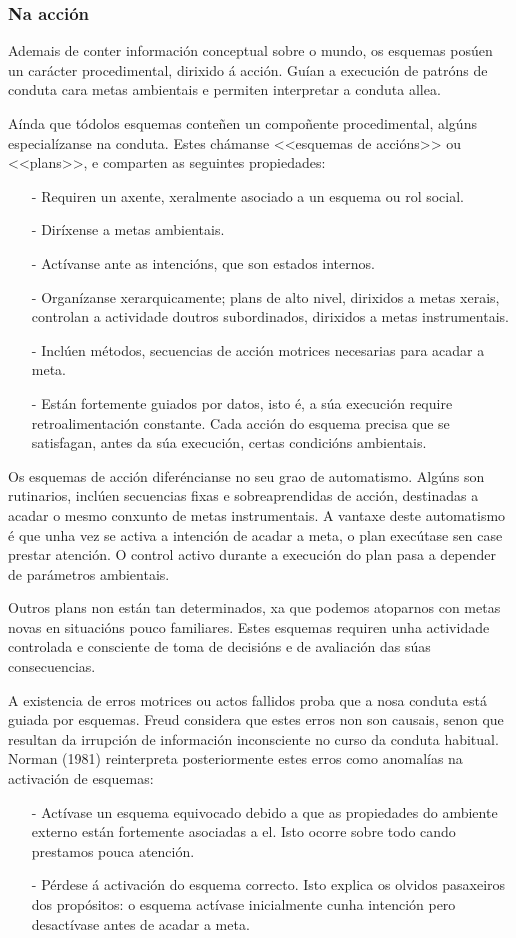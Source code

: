 \documentclass[a4paper,11pt]{article}
\begin{document}
\subsubsection{Na acción}
Ademais de conter información conceptual sobre o mundo, os esquemas posúen un carácter procedimental, dirixido á acción. Guían a execución de patróns de conduta cara metas ambientais e permiten interpretar a conduta allea.

Aínda que tódolos esquemas conteñen un compoñente procedimental, algúns especialízanse na conduta. Estes chámanse <<esquemas de accións>> ou <<plans>>, e comparten as seguintes propiedades:
\begin{itemize}
	\item[-] Requiren un axente, xeralmente asociado a un esquema ou rol social.
	\item[-] Diríxense a metas ambientais.
	\item[-] Actívanse ante as intencións, que son estados internos.
 	\item[-] Organízanse xerarquicamente; plans de alto nivel, dirixidos a metas xerais, controlan
 	a actividade doutros subordinados, dirixidos a metas instrumentais. 
	\item[-] Inclúen métodos, secuencias de acción motrices necesarias para acadar a meta.
	\item[-] Están fortemente guiados por datos, isto é, a súa execución require retroalimentación 
	constante. Cada acción do esquema precisa que se satisfagan, antes da súa execución, certas 
	condicións ambientais.
\end{itemize}

Os esquemas de acción diferéncianse no seu grao de automatismo. Algúns son rutinarios, inclúen secuencias fixas e sobreaprendidas de acción, destinadas a acadar o mesmo conxunto de metas instrumentais. A vantaxe deste automatismo é que unha vez se activa a intención de acadar a meta, o plan execútase sen case prestar atención. O control activo durante a execución do plan pasa a depender de parámetros ambientais.

Outros plans non están tan determinados, xa que podemos atoparnos con metas novas en situacións pouco familiares. Estes esquemas requiren unha actividade controlada e consciente de toma de decisións e de avaliación das súas consecuencias.

A existencia de erros motrices ou actos fallidos proba que a nosa conduta está guiada por esquemas. Freud considera que estes erros non son causais, senon que resultan da irrupción de información inconsciente no curso da conduta habitual. Norman (1981) reinterpreta posteriormente estes erros como anomalías na activación de esquemas:
\begin{itemize}
	\item[-] Actívase un esquema equivocado debido a que as propiedades do ambiente externo están 
	fortemente asociadas a el. Isto ocorre sobre todo cando prestamos pouca atención.
	\item[-] Pérdese á activación do esquema correcto. Isto explica os olvidos pasaxeiros dos 
	propósitos: o esquema actívase inicialmente cunha intención pero desactívase antes de acadar a 
	meta. 
\end{itemize}
\end{document}

